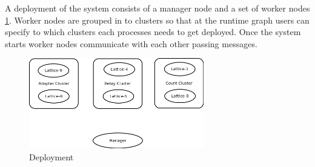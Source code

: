 A deployment of the system consists of a manager node and a set of worker nodes \ref{deployment}. Worker nodes are grouped in to clusters so that at the runtime graph users can specify to which clusters each processes needs to get deployed. Once the system starts worker nodes communicate with each other passing messages.

\begin{figure}[!t]
        \centering
        \includegraphics[width=3.0in]{deployment.png}
        \caption{Deployment}
        \label{deployment}
\end{figure}



 
